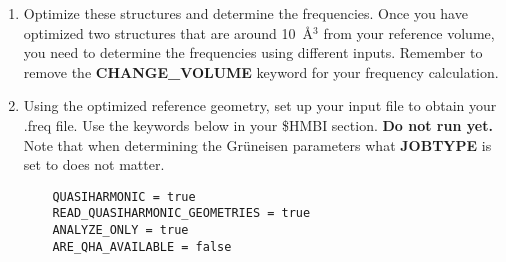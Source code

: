 \documentclass[11pt,letterpaper]{article}
\begin{document}
\begin{spacing}{1.0}
\begin{enumerate}
\begin{verbatim}

For PlusFreq:


 PRESSURE = -1

For MinusFreq:

 PRESSURE = 1
\end{verbatim}

  \item Optimize these structures and determine the frequencies.
    Once you have optimized two structures that are around 10~\AA$^3$ from your reference volume, you need to determine the frequencies using different inputs. Remember to remove the {\bf CHANGE\_VOLUME} keyword for your frequency calculation.
  \item Using the optimized reference geometry, set up your input file to obtain your .freq file. Use the keywords below in your \$HMBI section. {\bf Do not run yet.}
    Note that when determining the Gr\"{u}neisen parameters what {\bf JOBTYPE} is set to does not matter.

\begin{verbatim}
    QUASIHARMONIC = true
    READ_QUASIHARMONIC_GEOMETRIES = true
    ANALYZE_ONLY = true
    ARE_QHA_AVAILABLE = false
\end{verbatim}



\end{enumerate}
\end{spacing}
\end{document}
